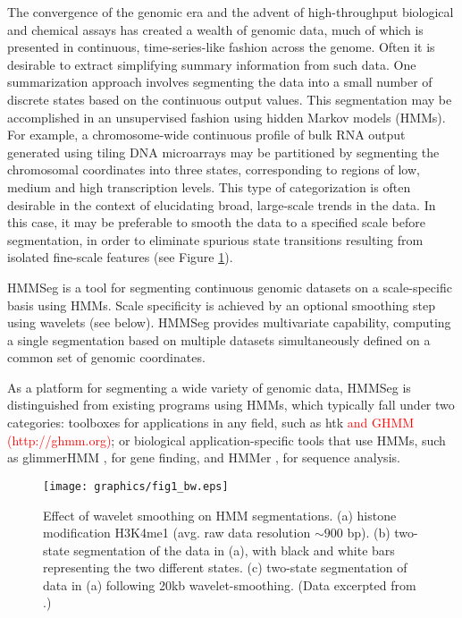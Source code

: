 \documentclass{bioinfo}
\begin{document}
The convergence of the genomic era and the advent of
high-throughput biological and chemical assays has created a wealth of
genomic data, much of which is presented in continuous,
time-series-like fashion across the genome.  Often it is desirable to
extract simplifying summary information from such data.  One
summarization approach involves segmenting the data into a small
number of discrete states based on the continuous output values.  This
segmentation may be accomplished in an unsupervised fashion using
hidden Markov models (HMMs).  For example, a chromosome-wide
continuous profile of bulk RNA output generated using tiling DNA
microarrays may be partitioned by segmenting the chromosomal
coordinates into three states, corresponding to regions of low, medium
and high transcription levels.  This type of categorization is often
desirable in the context of elucidating broad, large-scale trends in
the data.  In this case, it may be preferable to smooth the data to a
specified scale before segmentation, in order to eliminate spurious
state transitions resulting from isolated fine-scale features (see
Figure \ref{scales}).

HMMSeg is a tool for segmenting continuous genomic datasets on a
scale-specific basis using HMMs.  Scale specificity is achieved by an
optional smoothing step using wavelets (see below).  HMMSeg provides
multivariate capability, computing a single segmentation based on
multiple datasets simultaneously defined on a common set of genomic
coordinates.  

As a platform for segmenting a wide variety of genomic data, HMMSeg is
distinguished from existing programs using HMMs, which typically fall
under two categories: toolboxes for applications in any field, such as
htk \citep{young:htk} \textcolor{red}{and GHMM (http://ghmm.org)}; or
biological application-specific tools that use HMMs, such as
glimmerHMM \citep{majoros:tigrscan}, for gene finding, and HMMer
\citep{eddy:hmmer}, for sequence analysis.


\begin{figure}
  \centering
  \texttt{[image: graphics/fig1\_bw.eps]}
  \caption{Effect of wavelet smoothing on HMM segmentations.  (a)
  histone modification H3K4me1 (avg. raw data resolution $\sim900$
  bp).  (b) two-state segmentation of the data in (a), with black and
  white bars representing the two different states. (c) two-state
  segmentation of data in (a) following 20kb wavelet-smoothing. (Data
  excerpted from \citep{thurman:identification}.)}
  \label{scales}
\end{figure}
\end{document}
